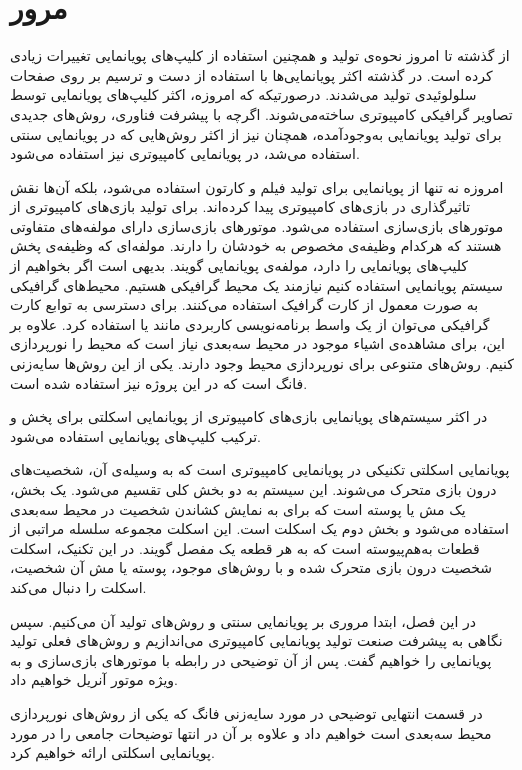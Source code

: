 \chapter { مرور }

از گذشته تا امروز نحوه‌ی تولید و همچنین استفاده از کلیپ‌های پویانمایی تغییرات زیادی کرده است.
در گذشته اکثر پویانمایی‌ها با استفاده از دست و ترسیم بر روی صفحات سلولوئیدی تولید می‌شدند.
درصورتیکه که امروزه، اکثر کلیپ‌های پویانمایی توسط تصاویر گرافیکی کامپیوتری ساخته‌می‌شوند.
اگرچه با پیشرفت فناوری، روش‌های جدیدی برای تولید پویانمایی به‌وجودآمده، همچنان نیز از اکثر روش‌هایی که در 
پویانمایی سنتی استفاده می‌شد، در پویانمایی کامپیوتری نیز استفاده می‌شود.

امروزه نه تنها از پویانمایی برای تولید فیلم و کارتون استفاده می‌شود، بلکه آن‌ها نقش 
تاثیرگذاری در بازی‌های کامپیوتری پیدا کرده‌اند.
برای تولید بازی‌های کامپیوتری از موتور‌های بازی‌سازی استفاده می‌شود.
موتور‌های بازی‌سازی دارای مولفه‌های متفاوتی هستند که هرکدام وظیفه‌ی مخصوص به خودشان را دارند.
مولفه‌ای که وظیفه‌ی پخش کلیپ‌های پویانمایی را دارد، مولفه‌ی پویانمایی گویند.
بدیهی است اگر بخواهیم از سیستم پویانمایی استفاده کنیم نیازمند یک محیط گرافیکی هستیم.
محیط‌های گرافیکی به صورت معمول از کارت گرافیک استفاده می‌کنند. برای دسترسی به توابع 
کارت گرافیکی می‌توان از یک واسط برنامه‌نویسی کاربردی مانند 
یا
استفاده کرد.
علاوه بر این، برای مشاهده‌ی اشیاء موجود در محیط سه‌بعدی نیاز است که محیط را نورپردازی کنیم.
روش‌های متنوعی برای نورپردازی محیط وجود دارند. یکی از این روش‌ها 
سایه‌زنی فانگ
است که در این پروژه نیز استفاده شده است.

در اکثر سیستم‌های پویانمایی بازی‌های کامپیوتری از پویانمایی اسکلتی برای پخش و ترکیب کلیپ‌های پویانمایی 
استفاده می‌شود.

پویانمایی اسکلتی تکنیکی در پویانمایی کامپیوتری است که به وسیله‌ی آن، شخصیت‌های درون بازی متحرک می‌شوند. 
این سیستم به دو بخش کلی تقسیم می‌شود.
یک بخش، یک مش یا پوسته است که برای به نمایش کشاندن شخصیت در محیط سه‌بعدی استفاده می‌شود و بخش دوم یک اسکلت است. این اسکلت مجموعه سلسله مراتبی از قطعات به‌‌هم‌پیوسته است که به هر قطعه یک مفصل گویند.
در این تکنیک، اسکلت شخصیت درون بازی متحرک شده و با روش‌های موجود، پوسته یا مش آن شخصیت، اسکلت را دنبال می‌کند.


در این فصل، ابتدا مروری بر پویانمایی سنتی و روش‌های تولید آن می‌کنیم. سپس نگاهی به 
پیشرفت صنعت تولید پویانمایی کامپیوتری می‌اندازیم و روش‌های فعلی تولید پویانمایی را خواهیم گفت.
پس از آن توضیحی در رابطه با موتور‌های بازی‌سازی و به ویژه موتور آنریل خواهیم داد.

در قسمت انتهایی توضیحی در مورد 
سایه‌زنی فانگ
که یکی از روش‌های نورپردازی محیط سه‌بعدی است خواهیم داد و علاوه بر آن
در انتها توضیحات جامعی را در مورد پویانمایی اسکلتی ارائه خواهیم کرد.

